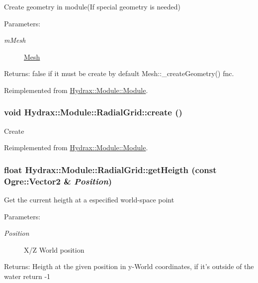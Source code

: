 Create geometry in module(If special geometry is needed) \begin{Desc}
\item[Parameters:]
\begin{description}
\item[{\em mMesh}]\hyperlink{class_hydrax_1_1_mesh}{Mesh} \end{description}
\end{Desc}
\begin{Desc}
\item[Returns:]false if it must be create by default Mesh::\_\-createGeometry() fnc. \end{Desc}


Reimplemented from \hyperlink{class_hydrax_1_1_module_1_1_module_e58d6103f780287cb00a8c4647db667e}{Hydrax::Module::Module}.\hypertarget{class_hydrax_1_1_module_1_1_radial_grid_8c0f059e53170e7d1114bb7faecbcb0a}{
\subsubsection[{create}]{\setlength{\rightskip}{0pt plus 5cm}void Hydrax::Module::RadialGrid::create ()}}
\label{class_hydrax_1_1_module_1_1_radial_grid_8c0f059e53170e7d1114bb7faecbcb0a}


Create 

Reimplemented from \hyperlink{class_hydrax_1_1_module_1_1_module_4b696328c3fc1496f757e929f44f3258}{Hydrax::Module::Module}.\hypertarget{class_hydrax_1_1_module_1_1_radial_grid_0289caac51efbaf6a085bbb94eb22c4c}{
\subsubsection[{getHeigth}]{\setlength{\rightskip}{0pt plus 5cm}float Hydrax::Module::RadialGrid::getHeigth (const Ogre::Vector2 \& {\em Position})}}
\label{class_hydrax_1_1_module_1_1_radial_grid_0289caac51efbaf6a085bbb94eb22c4c}


Get the current heigth at a especified world-space point \begin{Desc}
\item[Parameters:]
\begin{description}
\item[{\em Position}]X/Z World position \end{description}
\end{Desc}
\begin{Desc}
\item[Returns:]Heigth at the given position in y-World coordinates, if it's outside of the water return -1 \end{Desc}


